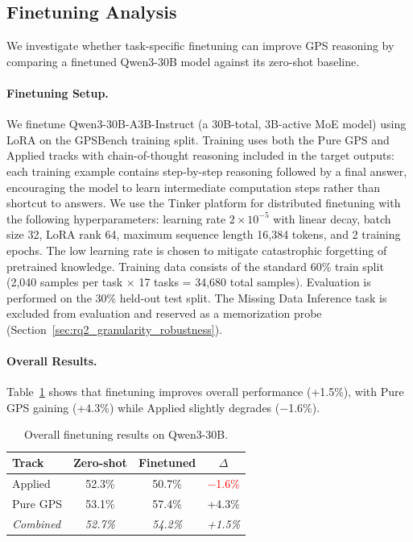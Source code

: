 \subsection{Finetuning Analysis}
\label{sec:finetuning_analysis}

We investigate whether task-specific finetuning can improve GPS reasoning by comparing a finetuned Qwen3-30B model against its zero-shot baseline.

\paragraph{Finetuning Setup.}
We finetune Qwen3-30B-A3B-Instruct (a 30B-total, 3B-active MoE model) using LoRA \cite{hu2022lora} on the GPSBench training split. Training uses both the Pure GPS and Applied tracks with chain-of-thought reasoning included in the target outputs: each training example contains step-by-step reasoning followed by a final answer, encouraging the model to learn intermediate computation steps rather than shortcut to answers. We use the Tinker platform for distributed finetuning with the following hyperparameters: learning rate $2 \times 10^{-5}$ with linear decay, batch size 32, LoRA rank 64, maximum sequence length 16{,}384 tokens, and 2 training epochs. The low learning rate is chosen to mitigate catastrophic forgetting of pretrained knowledge. Training data consists of the standard 60\% train split (2{,}040 samples per task $\times$ 17 tasks = 34{,}680 total samples). Evaluation is performed on the 30\% held-out test split. The Missing Data Inference task is excluded from evaluation and reserved as a memorization probe (Section~\ref{sec:rq2_granularity_robustness}).

\paragraph{Overall Results.}
Table~\ref{tab:finetuning_overall} shows that finetuning improves overall performance (+1.5\%), with Pure GPS gaining (+4.3\%) while Applied slightly degrades ($-$1.6\%).

\begin{table}[htbp]
\centering
\caption{Overall finetuning results on Qwen3-30B.}
\label{tab:finetuning_overall}
\small
\begin{tabular}{lccc}
\toprule
\textbf{Track} & \textbf{Zero-shot} & \textbf{Finetuned} & \textbf{$\Delta$} \\
\midrule
Applied & 52.3\% & 50.7\% & \textcolor{red}{$-$1.6\%} \\
Pure GPS & 53.1\% & 57.4\% & \textcolor{green!60!black}{+4.3\%} \\
\midrule
\textit{Combined} & \textit{52.7\%} & \textit{54.2\%} & \textit{\textcolor{green!60!black}{+1.5\%}} \\
\bottomrule
\end{tabular}
\end{table}

